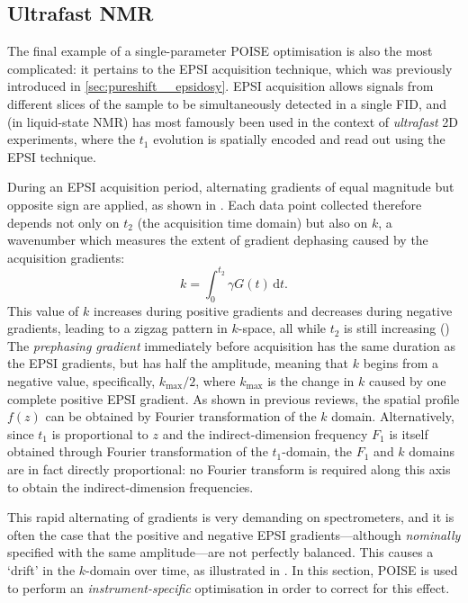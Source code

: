 \subsection{Ultrafast NMR}
\label{subsec:poise__epsi}

The final example of a single-parameter POISE optimisation is also the most complicated: it pertains to the EPSI acquisition technique, which was previously introduced in \cref{sec:pureshift__epsidosy}.
EPSI acquisition allows signals from different slices of the sample to be simultaneously detected in a single FID, and (in liquid-state NMR) has most famously been used in the context of \textit{ultrafast} 2D experiments\autocite{Frydman2002PNASUSA,Pelupessy2003JACS,Frydman2003JACS,Tal2010PNMRS,Giraudeau2014ARAC,Gouilleux2018ARNMRS}, where the $t_1$ evolution is spatially encoded and read out using the EPSI technique.

During an EPSI acquisition period, alternating gradients of equal magnitude but opposite sign are applied, as shown in .
Each data point collected therefore depends not only on $t_2$ (the acquisition time domain) but also on $k$, a wavenumber which measures the extent of gradient dephasing caused by the acquisition gradients:
\begin{equation}
    \label{eq:epsi_k_space}
    k = \int_0^{t_2} \gamma G(t) \,\mathrm{d}t.
\end{equation}
This value of $k$ increases during positive gradients and decreases during negative gradients, leading to a zigzag pattern in $k$-space, all while $t_2$ is still increasing ()
The \textit{prephasing gradient} immediately before acquisition has the same duration as the EPSI gradients, but has half the amplitude, meaning that $k$ begins from a negative value, specifically, $k_\text{max} / 2$, where $k_\text{max}$ is the change in $k$ caused by one complete positive EPSI gradient.
As shown in previous reviews\autocite{Frydman2003JACS}, the spatial profile $f(z)$ can be obtained by Fourier transformation of the $k$ domain.
Alternatively, since $t_1$ is proportional to $z$ and the indirect-dimension frequency $F_1$ is itself obtained through Fourier transformation of the $t_1$-domain, the $F_1$ and $k$ domains are in fact directly proportional: no Fourier transform is required along this axis to obtain the indirect-dimension frequencies.

This rapid alternating of gradients is very demanding on spectrometers, and it is often the case that the positive and negative EPSI gradients---although \textit{nominally} specified with the same amplitude---are not perfectly balanced.
This causes a `drift' in the $k$-domain over time, as illustrated in .
In this section, POISE is used to perform an \textit{instrument-specific} optimisation in order to correct for this effect.

